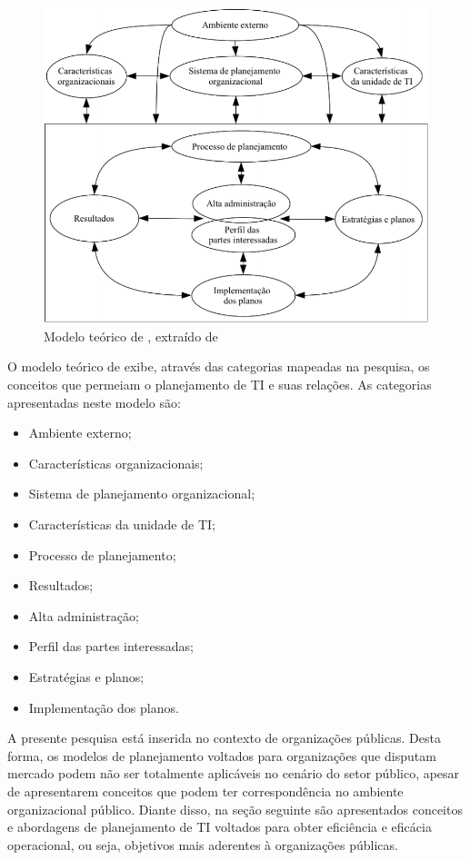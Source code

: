 \begin{figure}[h!]
\centering %
\includegraphics[width=14cm]{figuras/modeloBrown.png}
\caption{Modelo teórico de , extraído de }
\label{figura:modeloBrown}
\end{figure}

O modelo teórico de  exibe, através das categorias mapeadas na pesquisa, os conceitos que permeiam o planejamento de TI e suas relações. As categorias apresentadas neste modelo são:
\begin{itemize}
\item Ambiente externo;
\item Características organizacionais;
\item Sistema de planejamento organizacional;
\item Características da unidade de TI;
\item Processo de planejamento;
\item Resultados;
\item Alta administração;
\item Perfil das partes interessadas;
\item Estratégias e planos;
\item Implementação dos planos.
\end{itemize}


A presente pesquisa está inserida no contexto de organizações públicas. Desta forma, os modelos de planejamento voltados para organizações que disputam mercado podem não ser totalmente aplicáveis no cenário do setor público, apesar de apresentarem conceitos que podem ter correspondência no ambiente organizacional público. Diante disso, na seção seguinte são apresentados conceitos e abordagens de planejamento de TI voltados para obter eficiência e eficácia operacional, ou seja, objetivos mais aderentes à organizações públicas.

